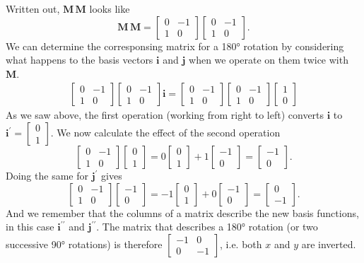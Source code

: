 \documentclass[a4paper]{article}
\newcommand{\bvec}[1]{\mathbf{#1}}
\newcommand{\cvec}[2]{\begin{bmatrix}#1\\#2\end{bmatrix}}
\begin{document}
Written out, $\bvec{M}\,\bvec{M}$ looks like
\begin{equation*}
\bvec{M}\,\bvec{M}= \begin{bmatrix}0 & -1\\ 1 & 0\end{bmatrix}\begin{bmatrix}0 & -1\\ 1 & 0\end{bmatrix}.
\end{equation*}
We can determine the corresponsing matrix for a \ang{180} rotation by considering what happens to the basis vectors $\bvec{i}$ and $\bvec{j}$ when we operate on them twice with $\bvec{M}$.
\begin{eqnarray*}
\begin{bmatrix}0 & -1\\ 1 & 0\end{bmatrix}\begin{bmatrix}0 & -1\\ 1 & 0\end{bmatrix}\bvec{i} = \begin{bmatrix}0 & -1\\ 1 & 0\end{bmatrix}\begin{bmatrix}0 & -1\\ 1 & 0\end{bmatrix}\cvec{1}{0}
\end{eqnarray*}
As we saw above, the first operation (working from right to left) converts $\bvec{i}$ to $\bvec{i^\prime}=\cvec{0}{1}$. We now calculate the effect of the second operation
\begin{equation*}
\begin{bmatrix}0 & -1\\ 1 & 0\end{bmatrix}\cvec{0}{1} = 0\cvec{0}{1} + 1\cvec{-1}{0} = \cvec{-1}{0}.
\end{equation*}
Doing the same for $\bvec{j^\prime}$ gives
\begin{equation*}
\begin{bmatrix}0 & -1\\ 1 & 0\end{bmatrix}\cvec{-1}{0} = -1\cvec{0}{1} + 0\cvec{-1}{0} = \cvec{0}{-1}.
\end{equation*}
And we remember that the columns of a matrix describe the new basis functions, in this case $\bvec{i^{\prime\prime}}$ and $\bvec{j^{\prime\prime}}$. The matrix that describes a \ang{180} rotation (or two successive \ang{90} rotations) is therefore $\begin{bmatrix}-1 & 0\\ 0 & -1\end{bmatrix}$, i.e. both $x$ and $y$ are inverted.
\end{document}
